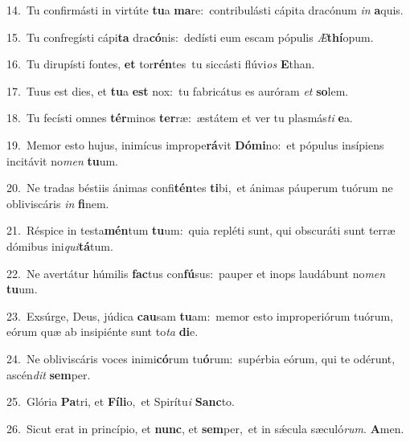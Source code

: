 {\numbfont\textcolor{\numbcolor}{14.}}~Tu confirmásti in virtúte \textbf{tu}\-a \textbf{ma}\-re:~\star contribulásti cápita dracónum \textit{in} \textbf{a}\-quis.\par
{\numbfont\textcolor{\numbcolor}{15.}}~Tu confregísti cápi\textbf{ta} dra\-\textbf{có}\-nis:~\star dedísti eum escam pópulis \textit{Æ}\-\textbf{thí}opum.\par
{\numbfont\textcolor{\numbcolor}{16.}}~Tu dirupísti fontes, \textbf{et} tor\-\textbf{rén}\-tes~\star tu siccásti flúvi\textit{os} \textbf{E}\-than.\par
{\numbfont\textcolor{\numbcolor}{17.}}~Tuus est dies, et \textbf{tu}\-a \textbf{est} nox:~\star tu fabricátus es auróram \textit{et} \textbf{so}\-lem.\par
{\numbfont\textcolor{\numbcolor}{18.}}~Tu fecísti omnes \textbf{tér}\-minos \textbf{ter}\-ræ:~\star æstátem et ver tu plasmás\textit{ti} \textbf{e}\-a.\par
{\numbfont\textcolor{\numbcolor}{19.}}~Memor esto hujus, inimícus imprope\-\textbf{rá}\-vit \textbf{Dó}\-\textbf{mi}no:~\star et pópulus insípiens incitávit no\textit{men} \textbf{tu}\-um.\par
{\numbfont\textcolor{\numbcolor}{20.}}~Ne tradas béstiis ánimas confi\-\textbf{tén}\-tes \textbf{ti}\-bi,~\star et ánimas páuperum tuórum ne obliviscáris \textit{in} \textbf{fi}\-nem.\par
{\numbfont\textcolor{\numbcolor}{21.}}~Réspice in testa\-\textbf{mén}\-tum \textbf{tu}\-um:~\star quia repléti sunt, qui obscuráti sunt terræ dómibus ini\-\textit{qui}\-\textbf{tá}tum.\par
{\numbfont\textcolor{\numbcolor}{22.}}~Ne avertátur húmilis \textbf{fac}\-tus con\-\textbf{fú}\-sus:~\star pauper et inops laudábunt no\textit{men} \textbf{tu}\-um.\par
{\numbfont\textcolor{\numbcolor}{23.}}~Exsúrge, Deus, júdica \textbf{cau}\-sam \textbf{tu}\-am:~\star memor esto improperiórum tuórum, eórum quæ ab insipiénte sunt to\textit{ta} \textbf{di}\-e.\par
{\numbfont\textcolor{\numbcolor}{24.}}~Ne obliviscáris voces inimi\-\textbf{có}\-rum tu\-\textbf{ó}\-rum:~\star supérbia eórum, qui te odérunt, ascén\textit{dit} \textbf{sem}\-per.\par
{\numbfont\textcolor{\numbcolor}{25.}}~Glória \textbf{Pa}\-tri, et \textbf{Fí}\-\textbf{li}o,~\star et Spirítu\textit{i} \textbf{Sanc}\-to.\par
{\numbfont\textcolor{\numbcolor}{26.}}~Sicut erat in princípio, et \textbf{nunc}\-, et \textbf{sem}\-per,~\star et in sǽcula sæculó\-\textit{rum}\-. \textbf{A}\-men.\par
